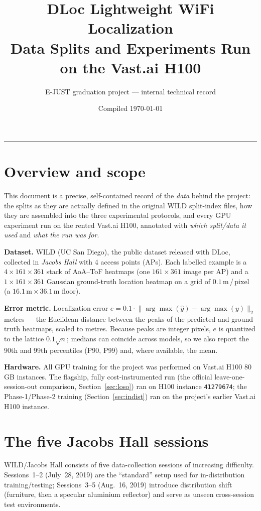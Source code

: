 \documentclass[11pt]{article}
\title{\textbf{DLoc Lightweight WiFi Localization}\\[2pt]
\large Data Splits and Experiments Run on the Vast.ai H100}
\author{E-JUST graduation project --- internal technical record}
\date{Compiled \today}
\begin{document}
\maketitle
\vspace{-1.2em}
\hrule
\vspace{1em}

\section{Overview and scope}
This document is a precise, self-contained record of the \emph{data} behind the
project: the splits as they are actually defined in the original WILD
split-index files, how they are assembled into the three experimental
protocols, and every GPU experiment run on the rented Vast.ai H100, annotated
with \emph{which split/data it used} and \emph{what the run was for}.

\textbf{Dataset.} WILD (UC San Diego), the public dataset released with DLoc,
collected in \emph{Jacobs Hall} with 4 access points (APs). Each labelled
example is a $4\times161\times361$ stack of AoA--ToF heatmaps (one $161\times361$
image per AP) and a $1\times161\times361$ Gaussian ground-truth location heatmap
on a grid of $0.1$\,m\,/\,pixel (a $16.1\,\text{m}\times36.1\,\text{m}$ floor).

\textbf{Error metric.} Localization error
$e = 0.1\cdot\lVert \arg\max(\hat{y}) - \arg\max(y)\rVert_2$ metres --- the
Euclidean distance between the peaks of the predicted and ground-truth heatmaps,
scaled to metres. Because peaks are integer pixels, $e$ is quantized to the
lattice $0.1\sqrt{n}$; medians can coincide across models, so we also report the
90th and 99th percentiles (P90, P99) and, where available, the mean.

\textbf{Hardware.} All GPU training for the project was performed on Vast.ai
H100 80\,GB instances. The flagship, fully cost-instrumented run (the official
leave-one-session-out comparison, Section~\ref{sec:loso}) ran on H100 instance
\texttt{41279674}; the Phase-1/Phase-2 training (Section~\ref{sec:indist}) ran on
the project's earlier Vast.ai H100 instance.

\section{The five Jacobs Hall sessions}
WILD/Jacobs Hall consists of five data-collection sessions of increasing
difficulty. Sessions~1--2 (July~28, 2019) are the ``standard'' setup used for
in-distribution training/testing; Sessions~3--5 (Aug.~16, 2019) introduce
distribution shift (furniture, then a specular aluminium reflector) and serve as
unseen cross-session test environments.
\end{document}
